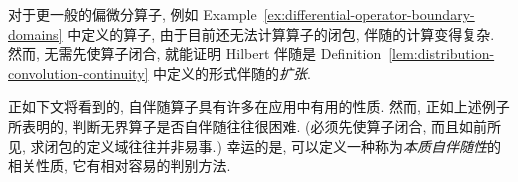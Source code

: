 \begin{Example}
\label{ex:general-differential-hilbert-formal-adjoint}
对于更一般的偏微分算子, 例如 Example~\ref{ex:differential-operator-boundary-domains} 中定义的算子, 由于目前还无法计算算子的闭包, 伴随的计算变得复杂. 然而, 无需先使算子闭合, 就能证明 Hilbert 伴随是 Definition~\ref{lem:distribution-convolution-continuity} 中定义的形式伴随的\emph{扩张}.
\end{Example}

正如下文将看到的, 自伴随算子具有许多在应用中有用的性质. 然而, 正如上述例子所表明的, 判断无界算子是否自伴随往往很困难. (必须先使算子闭合, 而且如前所见, 求闭包的定义域往往并非易事.) 幸运的是, 可以定义一种称为\emph{本质自伴随性}的相关性质, 它有相对容易的判别方法.
